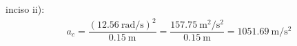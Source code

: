 \documentclass[12pt]{article}
\begin{document}
\vspace*{0.5cm}
inciso ii):
\begin{align*}
a_{c} = \dfrac{\displaystyle \left( \SI[per-mode=fraction]{12.56}{\radian\per\second} \right)^{2}}{\SI{0.15}{\meter}} = \dfrac{\displaystyle \SI[per-mode=fraction]{157.75}{\square\meter\per\square\second}}{\SI{0.15}{\meter}} = \SI[per-mode=fraction]{1051.69}{\meter\per\square\second}
\end{align*}
\end{document}

